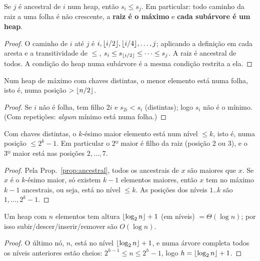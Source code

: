 \begin{prop}\label{prop:ancestral}
Se $j$ é ancestral de $i$ num heap, então $s_i\le s_j$. Em particular: todo caminho da raiz a uma folha é não crescente, a \textbf{raiz é o máximo} e \textbf{cada subárvore é um heap}.
\end{prop}
\begin{proof}
O caminho de $i$ até $j$ é $i,\lfloor i/2\rfloor,\lfloor i/4\rfloor,\dots,j$; aplicando a definição em cada aresta e a transitividade de $\le$, $s_i\le s_{\lfloor i/2\rfloor}\le\cdots\le s_j$. A raiz é ancestral de todos. A condição do heap numa subárvore é a mesma condição restrita a ela.
\end{proof}

\begin{prop}
Num heap de máximo com chaves distintas, o menor elemento está numa folha, isto é, numa posição $>\lfloor n/2\rfloor$.
\end{prop}
\begin{proof}
Se $i$ não é folha, tem filho $2i$ e $s_{2i}<s_i$ (distintas); logo $s_i$ não é o mínimo. (Com repetições: \emph{algum} mínimo está numa folha.)
\end{proof}

\begin{prop}
Com chaves distintas, o $k$-ésimo maior elemento está num nível $\le k$, isto é, numa posição $\le 2^k-1$. Em particular o 2º maior é filho da raiz (posição 2 ou 3), e o 3º maior está nas posições $2,\dots,7$.
\end{prop}
\begin{proof}
Pela Prop.~\ref{prop:ancestral}, todos os ancestrais de $x$ são maiores que $x$. Se $x$ é o $k$-ésimo maior, só existem $k-1$ elementos maiores, então $x$ tem no máximo $k-1$ ancestrais, ou seja, está no nível $\le k$. As posições dos níveis $1..k$ são $1,\dots,2^k-1$.
\end{proof}

\begin{prop}[Altura]
Um heap com $n$ elementos tem altura $\lfloor\log_2 n\rfloor+1$ (em níveis) $=\Theta(\log n)$; por isso subir/descer/inserir/remover são $O(\log n)$.
\end{prop}
\begin{proof}
O último nó, $n$, está no nível $\lfloor\log_2n\rfloor+1$, e numa árvore completa todos os níveis anteriores estão cheios: $2^{h-1}\le n\le 2^h-1$, logo $h=\lfloor\log_2n\rfloor+1$.
\end{proof}

